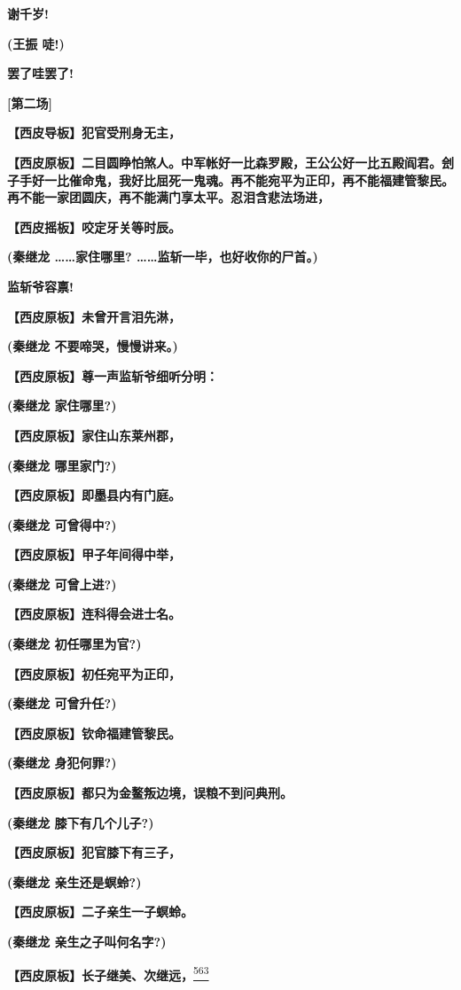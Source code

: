 \textbf{谢千岁!}

\textbf{(王振 唗!)}

\textbf{罢了哇罢了!}

\textbf{{[}第二场{]}}

\textbf{【西皮导板】犯官受刑身无主，}

\textbf{【西皮原板】二目圆睁怕煞人。中军帐好一比森罗殿，王公公好一比五殿阎君。刽子手好一比催命鬼，我好比屈死一鬼魂。再不能宛平为正印，再不能福建管黎民。再不能一家团圆庆，再不能满门享太平。忍泪含悲法场进，}

\textbf{【西皮摇板】咬定牙关等时辰。}

\textbf{(秦继龙 \ldots{}\ldots{}家住哪里?
\ldots{}\ldots{}监斩一毕，也好收你的尸首。)}

\textbf{监斩爷容禀!}

\textbf{【西皮原板】未曾开言泪先淋，}

\textbf{(秦继龙 不要啼哭，慢慢讲来。)}

\textbf{【西皮原板】尊一声监斩爷细听分明：}

\textbf{(秦继龙 家住哪里?)}

\textbf{【西皮原板】家住山东莱州郡，}

\textbf{(秦继龙 哪里家门?)}

\textbf{【西皮原板】即墨县内有门庭。}

\textbf{(秦继龙 可曾得中?)}

\textbf{【西皮原板】甲子年间得中举，}

\textbf{(秦继龙 可曾上进?)}

\textbf{【西皮原板】连科得会进士名。}

\textbf{(秦继龙 初任哪里为官?)}

\textbf{【西皮原板】初任宛平为正印，}

\textbf{(秦继龙 可曾升任?)}

\textbf{【西皮原板】钦命福建管黎民。}

\textbf{(秦继龙 身犯何罪?)}

\textbf{【西皮原板】都只为金鳌叛边境，误粮不到问典刑。}

\textbf{(秦继龙 膝下有几个儿子?)}

\textbf{【西皮原板】犯官膝下有三子，}

\textbf{(秦继龙 亲生还是螟蛉?)}

\textbf{【西皮原板】二子亲生一子螟蛉。}

\textbf{(秦继龙 亲生之子叫何名字?)}

\textbf{【西皮原板】长子继美、次继远，}\protect\hyperlink{fn563}{\textsuperscript{563}}

